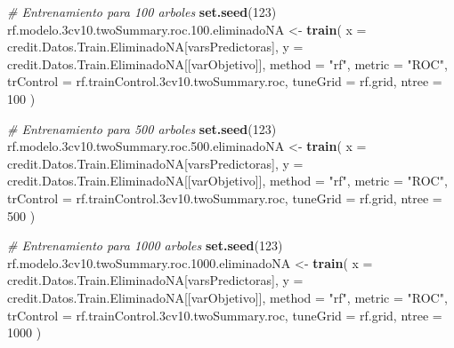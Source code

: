 \documentclass[
]{article}
\newenvironment{Shaded}{\begin{snugshade}}{\end{snugshade}}
\newcommand{\AttributeTok}[1]{\textcolor[rgb]{0.13,0.29,0.53}{#1}}
\newcommand{\CommentTok}[1]{\textcolor[rgb]{0.56,0.35,0.01}{\textit{#1}}}
\newcommand{\DecValTok}[1]{\textcolor[rgb]{0.00,0.00,0.81}{#1}}
\newcommand{\FloatTok}[1]{\textcolor[rgb]{0.00,0.00,0.81}{#1}}
\newcommand{\FunctionTok}[1]{\textcolor[rgb]{0.13,0.29,0.53}{\textbf{#1}}}
\newcommand{\NormalTok}[1]{#1}
\newcommand{\OtherTok}[1]{\textcolor[rgb]{0.56,0.35,0.01}{#1}}
\newcommand{\StringTok}[1]{\textcolor[rgb]{0.31,0.60,0.02}{#1}}
\begin{document}
\begin{Shaded}
\begin{Highlighting}[]
\CommentTok{\# Entrenamiento para 100 arboles}
\FunctionTok{set.seed}\NormalTok{(}\DecValTok{123}\NormalTok{)}
\NormalTok{rf.modelo}\FloatTok{.3}\NormalTok{cv10.twoSummary.roc.}\FloatTok{100.}\NormalTok{eliminadoNA }\OtherTok{\textless{}{-}} \FunctionTok{train}\NormalTok{(}
  \AttributeTok{x =}\NormalTok{ credit.Datos.Train.EliminadoNA[varsPredictoras],}
  \AttributeTok{y =}\NormalTok{ credit.Datos.Train.EliminadoNA[[varObjetivo]],}
  \AttributeTok{method =} \StringTok{"rf"}\NormalTok{, }
  \AttributeTok{metric =} \StringTok{"ROC"}\NormalTok{,}
  \AttributeTok{trControl =}\NormalTok{ rf.trainControl}\FloatTok{.3}\NormalTok{cv10.twoSummary.roc,}
  \AttributeTok{tuneGrid =}\NormalTok{ rf.grid,}
  \AttributeTok{ntree =} \DecValTok{100}
\NormalTok{)}

\CommentTok{\# Entrenamiento para 500 arboles}
\FunctionTok{set.seed}\NormalTok{(}\DecValTok{123}\NormalTok{)}
\NormalTok{rf.modelo}\FloatTok{.3}\NormalTok{cv10.twoSummary.roc.}\FloatTok{500.}\NormalTok{eliminadoNA }\OtherTok{\textless{}{-}} \FunctionTok{train}\NormalTok{(}
  \AttributeTok{x =}\NormalTok{ credit.Datos.Train.EliminadoNA[varsPredictoras],}
  \AttributeTok{y =}\NormalTok{ credit.Datos.Train.EliminadoNA[[varObjetivo]],}
  \AttributeTok{method =} \StringTok{"rf"}\NormalTok{, }
  \AttributeTok{metric =} \StringTok{"ROC"}\NormalTok{,}
  \AttributeTok{trControl =}\NormalTok{ rf.trainControl}\FloatTok{.3}\NormalTok{cv10.twoSummary.roc,}
  \AttributeTok{tuneGrid =}\NormalTok{ rf.grid,}
  \AttributeTok{ntree =} \DecValTok{500}
\NormalTok{)}

\CommentTok{\# Entrenamiento para 1000 arboles}
\FunctionTok{set.seed}\NormalTok{(}\DecValTok{123}\NormalTok{)}
\NormalTok{rf.modelo}\FloatTok{.3}\NormalTok{cv10.twoSummary.roc.}\FloatTok{1000.}\NormalTok{eliminadoNA }\OtherTok{\textless{}{-}} \FunctionTok{train}\NormalTok{(}
  \AttributeTok{x =}\NormalTok{ credit.Datos.Train.EliminadoNA[varsPredictoras],}
  \AttributeTok{y =}\NormalTok{ credit.Datos.Train.EliminadoNA[[varObjetivo]],}
  \AttributeTok{method =} \StringTok{"rf"}\NormalTok{, }
  \AttributeTok{metric =} \StringTok{"ROC"}\NormalTok{,}
  \AttributeTok{trControl =}\NormalTok{ rf.trainControl}\FloatTok{.3}\NormalTok{cv10.twoSummary.roc,}
  \AttributeTok{tuneGrid =}\NormalTok{ rf.grid,}
  \AttributeTok{ntree =} \DecValTok{1000}
\NormalTok{)}
\end{Highlighting}
\end{Shaded}
\end{document}
